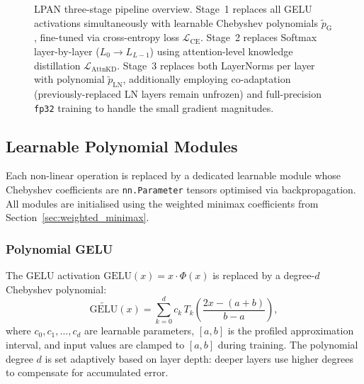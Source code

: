 \begin{figure}[htbp]
{%
}
\caption{LPAN three-stage pipeline overview. Stage~1 replaces all GELU activations simultaneously with learnable Chebyshev polynomials $\tilde{p}_\mathrm{G}$, fine-tuned via cross-entropy loss $\mathcal{L}_\mathrm{CE}$. Stage~2 replaces Softmax layer-by-layer ($L_0\!\to\!L_{L-1}$) using attention-level knowledge distillation $\mathcal{L}_\mathrm{AttnKD}$. Stage~3 replaces both LayerNorms per layer with polynomial $\tilde{p}_\mathrm{LN}$, additionally employing co-adaptation (previously-replaced LN layers remain unfrozen) and full-precision \texttt{fp32} training to handle the small gradient magnitudes.}
\label{fig:lpan_pipeline}
\end{figure}

\subsection{Learnable Polynomial Modules}
\label{sec:poly_modules}

Each non-linear operation is replaced by a dedicated learnable module whose Chebyshev coefficients are \texttt{nn.Parameter} tensors optimised via backpropagation. All modules are initialised using the weighted minimax coefficients from Section~\ref{sec:weighted_minimax}.

\subsubsection{Polynomial GELU}

The GELU activation $\mathrm{GELU}(x) = x \cdot \Phi(x)$ is replaced by a degree-$d$ Chebyshev polynomial:
\begin{equation}
    \widetilde{\mathrm{GELU}}(x) = \sum_{k=0}^{d} c_k\, T_k\!\left(\frac{2x - (a+b)}{b-a}\right),
    \label{eq:poly_gelu}
\end{equation}
where $c_0, c_1, \ldots, c_d$ are learnable parameters, $[a, b]$ is the profiled approximation interval, and input values are clamped to $[a, b]$ during training. The polynomial degree $d$ is set adaptively based on layer depth: deeper layers use higher degrees to compensate for accumulated error.

